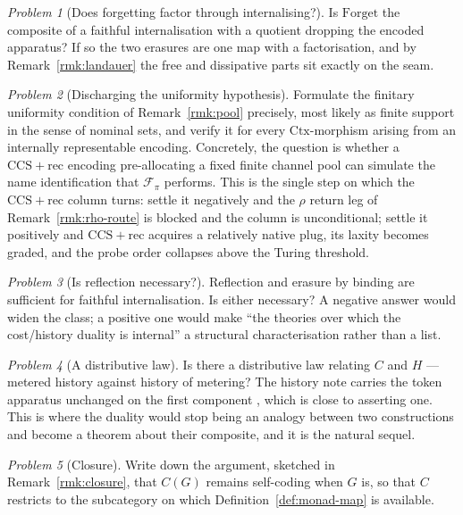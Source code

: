 \documentclass[11pt,a4paper]{article}
\theoremstyle{definition}
\theoremstyle{plain}
\theoremstyle{remark}
\newtheorem{problem}{Problem}
\newcommand{\CtxC}{\mathrm{Ctx}}
\newcommand{\rhoc}{\rho}
\newcommand{\CCSrec}{\mathrm{CCS}{+}\mathrm{rec}}
\begin{document}
\begin{problem}[Does forgetting factor through internalising?]
\label{prob:factorisation}
Is $\mathrm{Forget}$ the composite of a faithful internalisation with a quotient dropping the encoded
apparatus? If so the two erasures are one map with a factorisation, and by
Remark~\ref{rmk:landauer} the free and dissipative parts sit exactly on the seam.
\end{problem}

\begin{problem}[Discharging the uniformity hypothesis]
\label{prob:pool}
Formulate the finitary uniformity condition of Remark~\ref{rmk:pool} precisely, most likely as finite
support in the sense of nominal sets, and verify it for every $\CtxC$-morphism arising from an
internally representable encoding. Concretely, the question is whether a $\CCSrec$ encoding
pre-allocating a fixed finite channel pool can simulate the name identification that $\mathcal{F}_\pi$
performs. This is the single step on which the $\CCSrec$ column turns: settle it negatively and the
$\rhoc$ return leg of Remark~\ref{rmk:rho-route} is blocked and the column is unconditional; settle
it positively and $\CCSrec$ acquires a relatively native plug, its laxity becomes graded, and the
probe order collapses above the Turing threshold.
\end{problem}

\begin{problem}[Is reflection necessary?]
\label{prob:necessary}
Reflection and erasure by binding are sufficient for faithful internalisation. Is either necessary?
A negative answer would widen the class; a positive one would make ``the theories over which the
cost/history duality is internal'' a structural characterisation rather than a list.
\end{problem}

\begin{problem}[A distributive law]
\label{prob:distributive}
Is there a distributive law relating $C$ and $H$ --- metered history against history of metering? The
history note carries the token apparatus unchanged on the first component \cite[Def.~2.2]{history},
which is close to asserting one. This is where the duality would stop being an analogy between two
constructions and become a theorem about their composite, and it is the natural sequel.
\end{problem}

\begin{problem}[Closure]
\label{prob:closure}
Write down the argument, sketched in Remark~\ref{rmk:closure}, that $C(G)$ remains self-coding when
$G$ is, so that $C$ restricts to the subcategory on which Definition~\ref{def:monad-map} is
available.
\end{problem}
\end{document}
